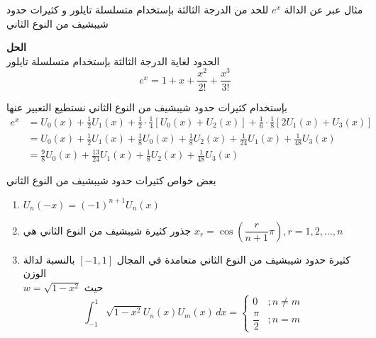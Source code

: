 	\begin{frame}
		
		\pause
		\begin{exampleblock}{مثال}
			عبر عن الدالة $e^x$ للحد من الدرجة الثالثة بإستخدام متسلسلة تايلور و كثيرات حدود شيبشيف من النوع الثاني
		
		\pause
		\noindent
		\textbf{الحل}\\
		\noindent
		الحدود لغاية الدرجة الثالثة بإستخدام متسلسلة تايلور 
		\[
		e^x = 1 + x + \frac{x^2}{2!} + \frac{x^3}{3!}
		\]
		
		\pause
		بإستخدام كثيرات حدود شيبشيف من النوع الثاني نستطيع التعبير عنها
		\begin{align*}
			e^x &= U_0(x) + \frac{1}{2}U_1(x) + \frac{1}{2}\cdot\frac{1}{4}[U_0(x) + U_2(x)] + \frac{1}{6}\cdot\frac{1}{8}[2U_1(x) + U_3(x)]\\
			&= U_0(x) + \frac{1}{2}U_1(x) + \frac{1}{8}U_0(x) + \frac{1}{8}U_2(x) + \frac{1}{24}U_1(x) + \frac{1}{48}U_3(x)\\
			&= \frac{9}{8}U_0(x) + \frac{13}{24}U_1(x) + \frac{1}{8}U_2(x) + \frac{1}{48}U_3(x)
		\end{align*}
		\end{exampleblock}
	\end{frame}
	
	\begin{frame}{بعض خواص كثيرات حدود شيبشيف من النوع الثاني}
		\begin{enumerate}
			
			\pause
			\item $U_n(-x) = (-1)^{n+1} U_n(x)$
			
			\pause
			\item جذور كثيرة شيبشيف من النوع الثاني هي \quad $x_r = \cos\left(\dfrac{r}{n+1}\pi\right), r=1,2,\dots,n$
			
			\pause
			\item كثيرة حدود شيبشيف من النوع الثاني متعامدة في المجال $[-1,1]$ بالنسبة لدالة الوزن \\$w = \sqrt{1-x^2}$ حيث
			\[
			\int_{-1}^{1} \sqrt{1-x^2} U_n(x) U_m(x)\, dx = \begin{cases}
				0 & ;n\neq m \\
				\dfrac{\pi}{2} & ; n = m
			\end{cases}
			\]
		\end{enumerate}
	\end{frame}
	
